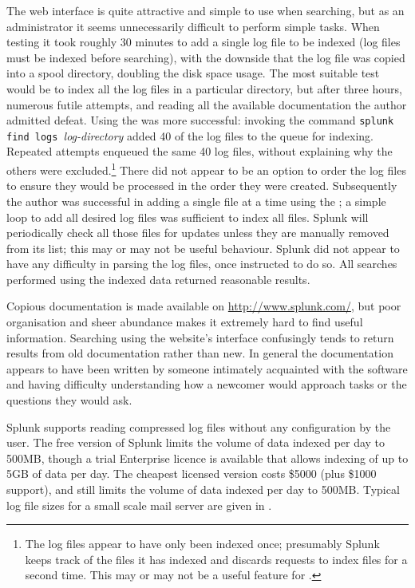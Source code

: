 The web interface is quite attractive and simple to use when searching, but
as an administrator it seems unnecessarily difficult to perform simple
tasks.  When testing it took roughly 30 minutes to add a single log file to
be indexed (log files must be indexed before searching), with the downside
that the log file was copied into a spool directory, doubling the disk
space usage.  The most suitable test would be to index all the log files in
a particular directory, but after three hours, numerous futile attempts,
and reading all the available documentation the author admitted defeat.
Using the \CLI{} was more successful: invoking the command \newline{}
\tab{} \texttt{splunk find logs }\textit{log-directory\/}\newline{} added
40 of the \numberOFlogFILES{} log files to the queue for indexing.
Repeated attempts enqueued the same 40 log files, without explaining why
the others were excluded.\footnote{The log files appear to have only been
indexed once; presumably Splunk keeps track of the files it has indexed and
discards requests to index files for a second time.  This may or may not be
a useful feature for \parsername{}.} There did not appear to be an option
to order the log files to ensure they would be processed in the order they
were created.  Subsequently the author was successful in adding a single
file at a time using the \CLI{}; a simple loop to add all desired log files
was sufficient to index all files.  Splunk will periodically check all
those files for updates unless they are manually removed from its list;
this may or may not be useful behaviour.  Splunk did not appear to have any
difficulty in parsing the log files, once instructed to do so.  All
searches performed using the indexed data returned reasonable results.

Copious documentation is made available on \url{http://www.splunk.com/},
but poor organisation and sheer abundance makes it extremely hard to find
useful information.  Searching using the website's interface confusingly
tends to return results from old documentation rather than new.  In
general the documentation appears to have been written by someone
intimately acquainted with the software and having difficulty understanding
how a newcomer would approach tasks or the questions they would ask.

Splunk supports reading compressed log files without any configuration by
the user.  The free version of Splunk limits the volume of data indexed per
day to 500MB, though a trial Enterprise licence is available that allows
indexing of up to 5GB of data per day.  The cheapest licensed version costs
\$5000 (plus \$1000 support), and still limits the volume of data indexed
per day to 500MB\@.  Typical log file sizes for a small scale mail server
are given in .

